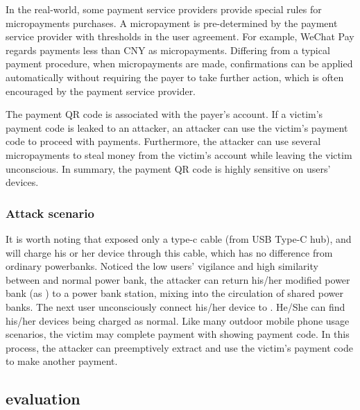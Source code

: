 In the real-world, some payment service providers provide special rules for micropayments purchases. A micropayment is pre-determined by the payment service provider with thresholds in the user agreement. For example, WeChat Pay regards payments less than CNY  as micropayments. Differing from a typical payment procedure, when micropayments are made, confirmations can be applied automatically without requiring the payer to take further action, which is often encouraged by the payment service provider.

The payment QR code is associated with the payer's account. If a victim's payment code is leaked to an attacker, an attacker can use the victim's payment code to proceed with payments. Furthermore, the attacker can use several micropayments to steal money from the victim's account while leaving the victim unconscious. In summary, the payment QR code is highly sensitive on users' devices.

\subsubsection{Attack scenario}

It is worth noting that \tool exposed only a type-c cable (from USB Type-C hub),
and \tool will charge his or her device through this cable, which has no difference from ordinary powerbanks. Noticed the low users' vigilance and high similarity between \tool and normal power bank, the attacker can return his/her modified power bank (as \tool) to a power bank station, mixing \tool into the circulation of shared power banks. The next user unconsciously connect his/her device to \tool. 
He/She can find his/her devices being charged as normal.
Like many outdoor mobile phone usage scenarios, the victim may complete payment with showing payment code. In this process, the attacker can preemptively extract and use the victim's payment code to make another payment.

\subsection{evaluation}


